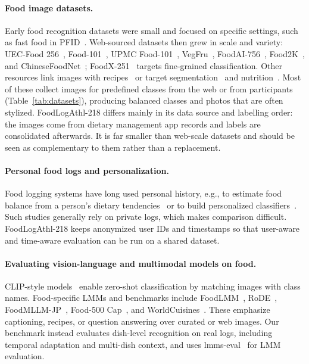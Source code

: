 \documentclass[sigconf, nonacm]{acmart}
\begin{document}
\paragraph{Food image datasets.} Early food recognition datasets were small and focused on specific settings, such as fast food in PFID~\cite{chen2009pfid}. Web-sourced datasets then grew in scale and variety: UEC-Food 256~\cite{kawano2015automatic}, Food-101~\cite{bossard2014food}, UPMC Food-101~\cite{wang2015recipe}, VegFru~\cite{hou2017vegfru}, FoodAI-756~\cite{sahoo2019foodai}, Food2K~\cite{min2023large}, and ChineseFoodNet~\cite{chen2017chinesefoodnet}; FoodX-251~\cite{kaur2019foodx} targets fine-grained classification. Other resources link images with recipes~\cite{salvador2017learning,marin2019learning} or target segmentation~\cite{wu2021large} and nutrition~\cite{thames2021nutrition5k}. Most of these collect images for predefined classes from the web or from participants (Table~\ref{tab:datasets}), producing balanced classes and photos that are often stylized. FoodLogAthl-218 differs mainly in its data source and labelling order: the images come from dietary management app records and labels are consolidated afterwards. It is far smaller than web-scale datasets and should be seen as complementary to them rather than a replacement.

\paragraph{Personal food logs and personalization.} Food logging systems have long used personal history, e.g., to estimate food balance from a person's dietary tendencies~\cite{Aizawa2013FoodBalance} or to build personalized classifiers~\cite{flg469,Horiguchi2018Personalized,Kim2021Boosting}. Such studies generally rely on private logs, which makes comparison difficult. FoodLogAthl-218 keeps anonymized user IDs and timestamps so that user-aware and time-aware evaluation can be run on a shared dataset.

\paragraph{Evaluating vision-language and multimodal models on food.} CLIP-style models~\cite{CLIP,sun2023eva} enable zero-shot classification by matching images with class names. Food-specific LMMs and benchmarks include FoodLMM~\cite{yin2023foodlmm}, RoDE~\cite{jiao2024rode}, FoodMLLM-JP~\cite{Imajuku2025FoodMLLM}, Food-500 Cap~\cite{ma2023food}, and WorldCuisines~\cite{winata2024worldcuisines}. These emphasize captioning, recipes, or question answering over curated or web images. Our benchmark instead evaluates dish-level recognition on real logs, including temporal adaptation and multi-dish context, and uses lmms-eval~\cite{lmms_eval2024,zhang2024lmmsevalrealitycheckevaluation} for LMM evaluation.
\end{document}
